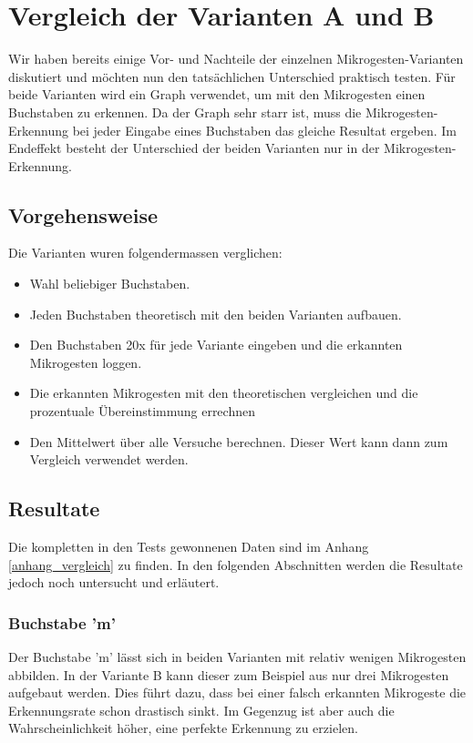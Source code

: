 \chapter{Vergleich der Varianten A und B}
Wir haben bereits einige Vor- und Nachteile der einzelnen Mikrogesten-Varianten diskutiert und möchten nun den tatsächlichen Unterschied praktisch testen. Für beide Varianten wird  ein Graph verwendet, um mit den Mikrogesten einen Buchstaben zu erkennen. Da der Graph sehr starr ist, muss die Mikrogesten-Erkennung bei jeder Eingabe eines Buchstaben das gleiche Resultat ergeben. Im Endeffekt besteht der Unterschied der beiden Varianten nur in der Mikrogesten-Erkennung.

\section{Vorgehensweise}
Die Varianten wuren folgendermassen verglichen:
\begin{itemize}
\item Wahl beliebiger Buchstaben.
\item Jeden Buchstaben theoretisch mit den beiden Varianten aufbauen.
\item Den Buchstaben 20x für jede Variante eingeben und die erkannten Mikrogesten loggen.
\item Die erkannten Mikrogesten mit den theoretischen vergleichen und die prozentuale Übereinstimmung errechnen
\item Den Mittelwert über alle Versuche berechnen. Dieser Wert kann dann zum Vergleich verwendet werden.
\end{itemize}

\section{Resultate}
Die kompletten in den Tests gewonnenen Daten sind im Anhang \ref{anhang_vergleich} zu finden. In den folgenden Abschnitten werden die Resultate jedoch noch untersucht und erläutert.

\subsection{Buchstabe 'm'}
Der Buchstabe 'm' lässt sich in beiden Varianten mit relativ wenigen Mikrogesten abbilden. In der Variante B kann dieser zum Beispiel aus nur drei Mikrogesten aufgebaut werden. Dies führt dazu, dass bei einer falsch erkannten Mikrogeste die Erkennungsrate schon drastisch sinkt. Im Gegenzug ist aber auch die Wahrscheinlichkeit höher, eine perfekte Erkennung zu erzielen.

